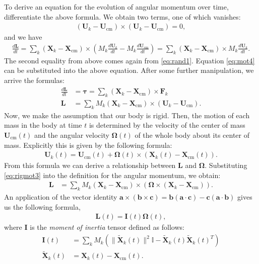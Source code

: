 \documentclass[10pt]{article}
\newcommand{\bs}[1]{{\boldsymbol #1}}
\begin{document}
To derive an equation for the evolution of angular momentum over time, differentiate the above formula.  We obtain two terms, one of which vanishes:
\begin{align*}
({\bs U}_k - {\bs U}_\text{cm}) \times ({\bs U}_k - {\bs U}_\text{cm}) = 0,
\end{align*}
and we have 
\begin{align*}
\frac{d{\bs L}}{dt} = \sum_k ({\bs X}_k - {\bs X}_\text{cm}) \times \left(M_k \frac{d{\bs U}_k}{dt} - M_k\frac{d {\bs U}_\text{cm}}{dt}\right) =  \sum_k ({\bs X}_k - {\bs X}_\text{cm}) \times M_k \frac{d{\bs U}_k}{dt}. 
\end{align*}
The second equality from above comes again from \eqref{eq:rand1}.  Equation \eqref{eq:mot4} can be substituted into the above equation.  After some further manipulation, we arrive the formulas:
\begin{align*}
\frac{d {\bs L}}{dt} &= {\bs \tau} = \sum_k ({\bs X}_k - {\bs X}_\text{cm}) \times {\bs F}_k \\
{\bs L} &= \sum_k M_k ({\bs X}_k - {\bs X}_\text{cm}) \times ({\bs U}_k - {\bs U}_\text{cm}).
\end{align*}
Now, we make the assumption that our body is rigid.  Then, the motion of each mass in the body at time $t$ is determined by the velocity of the center of mass ${\bs U}_\text{cm}(t)$ and the angular velocity ${\bs \Omega}(t)$ of the whole body about its center of mass.  Explicitly this is given by the following formula:
\begin{align}
\label{eq:rigmot3}
{\bs U}_k(t) = {\bs U}_\text{cm}(t) + {\bs \Omega}(t) \times ({\bs X}_k(t) - {\bs X}_\text{cm}(t)).
\end{align}  
From this formula we can derive a relationship between ${\bs L}$ and ${\bs \Omega}$.  Substituting \eqref{eq:rigmot3} into the definition for the angular momentum, we obtain:
\begin{align*}
{\bs L} &= \sum_k M_k ({\bs X}_k - {\bs X}_\text{cm}) \times ({\bs \Omega} \times ({\bs X}_k - {\bs X}_\text{cm})).
\end{align*}
An application of the vector identity ${\bs a} \times ({\bs b} \times {\bs c}) = {\bs b}({\bs a}\cdot {\bs c}) -  {\bs c}({\bs a}\cdot {\bs b})$ gives us the following formula,
\begin{align}
\label{eq:rigmot4}
{\bs L}(t) = {\bs I}(t) {\bs \Omega}(t),
\end{align}
where ${\bs I}$ is the {\em moment of inertia} tensor defined as follows:
\begin{align*}
{\bs I}(t) &= \sum_k M_k \left( \| \tilde{{\bs X}}_k(t) \|^2 \mathbb{I} - \tilde{{\bs X}}_k(t) \tilde{{\bs X}}_k(t)^T \right) \\
\tilde{{\bs X}}_k(t) &= {\bs X}_k(t) - {\bs X}_\text{cm}(t).
\end{align*}
\end{document}
